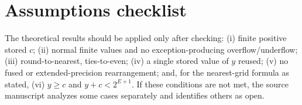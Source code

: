 \section{Assumptions checklist}
The theoretical results should be applied only after checking: (i) finite positive stored $c$; (ii) normal finite values and no exception-producing overflow/underflow; (iii) round-to-nearest, ties-to-even; (iv) a single stored value of $y$ reused; (v) no fused or extended-precision rearrangement; and, for the nearest-grid formula as stated, (vi) $y\ge c$ and $y+c<2^{E+1}$. If these conditions are not met, the source manuscript analyzes some cases separately and identifies others as open.
